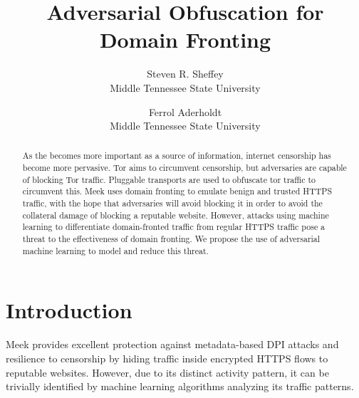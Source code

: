 
\date{}
\title{\Large Adversarial Obfuscation for Domain Fronting}
\author{
{\rm Steven R. Sheffey}\\
Middle Tennessee State University
\and
{\rm Ferrol Aderholdt}\\
Middle Tennessee State University
} %

\maketitle

\begin{abstract}
As the becomes more important as a source of information, internet censorship has become more pervasive. Tor aims to circumvent censorship, but adversaries are capable of blocking Tor traffic. Pluggable transports are used to obfuscate tor traffic to circumvent this. Meek uses domain fronting to emulate benign and trusted HTTPS traffic, with the hope that adversaries will avoid blocking it in order to avoid the collateral damage of blocking a reputable website. However, attacks using machine learning to differentiate domain-fronted traffic from regular HTTPS traffic pose a threat to the effectiveness of domain fronting. We propose the use of adversarial machine learning to model and reduce this threat.
\end{abstract}


\section{Introduction}
Meek provides excellent protection against metadata-based DPI attacks and resilience to censorship by hiding traffic inside encrypted HTTPS flows to reputable websites. However, due to its distinct activity pattern, it can be trivially identified by machine learning algorithms analyzing its traffic patterns.

